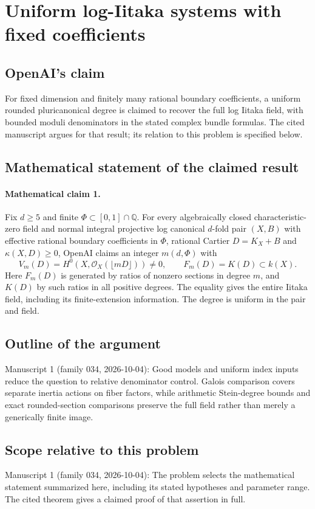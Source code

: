 \documentclass[11pt]{article}
\begin{document}
\section*{Uniform log-Iitaka systems with fixed coefficients}

\subsection{OpenAI's claim}
For fixed dimension and finitely many rational boundary coefficients, a uniform rounded pluricanonical degree is claimed to recover the full log Iitaka field, with bounded moduli denominators in the stated complex bundle formulas. The cited manuscript argues for that result; its relation to this problem is specified below.

\subsection{Mathematical statement of the claimed result}
\paragraph{Mathematical claim 1.} Fix $d\ge5$ and finite $\Phi\subset[0,1]\cap\mathbb Q$. For every algebraically closed characteristic-zero field and normal integral projective log canonical $d$-fold pair $(X,B)$ with effective rational boundary coefficients in $\Phi$, rational Cartier $D=K_X+B$ and $\kappa(X,D)\ge0$, OpenAI claims an integer $m(d,\Phi)$ with
\[
V_m(D)=H^0(X,\mathcal O_X(\lfloor mD\rfloor))\ne0,\qquad F_m(D)=K(D)\subset k(X).
\]
Here $F_m(D)$ is generated by ratios of nonzero sections in degree $m$, and $K(D)$ by such ratios in all positive degrees. The equality gives the entire Iitaka field, including its finite-extension information. The degree is uniform in the pair and field.

\subsection{Outline of the argument}
Manuscript 1 (family 034, 2026-10-04): Good models and uniform index inputs reduce the question to relative denominator control. Galois comparison covers separate inertia actions on fiber factors, while arithmetic Stein-degree bounds and exact rounded-section comparisons preserve the full field rather than merely a generically finite image.

\subsection{Scope relative to this problem}
Manuscript 1 (family 034, 2026-10-04): The problem selects the mathematical statement summarized here, including its stated hypotheses and parameter range. The cited theorem gives a claimed proof of that assertion in full.
\end{document}
